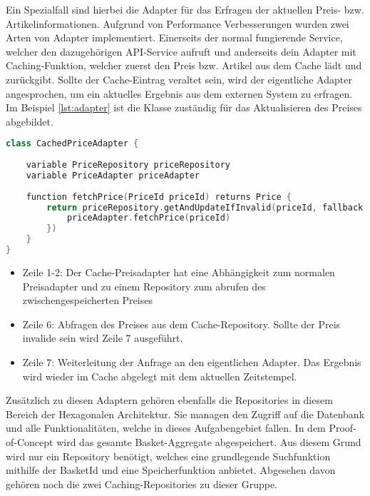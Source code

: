 Ein Spezialfall sind hierbei die Adapter für das Erfragen der aktuellen Preis- bzw. Artikelinformationen. Aufgrund von Performance Verbesserungen wurden zwei Arten von Adapter implementiert. Einerseits der normal fungierende Service, welcher den dazugehörigen API-Service aufruft und anderseits dein Adapter mit Caching-Funktion, welcher zuerst den Preis bzw. Artikel aus dem Cache lädt und zurückgibt. Sollte der Cache-Eintrag veraltet sein, wird der eigentliche Adapter angesprochen, um ein aktuelles Ergebnis aus dem externen System zu erfragen. Im Beispiel \ref{lst:adapter} ist die Klasse zuständig für das Aktualisieren des Preises abgebildet.

\begin{minipage}{\linewidth} %
	\begin{lstlisting}[caption={Preisadapter mit Caching-Funktion}, label={lst:adapter}, language=Kotlin]
class CachedPriceAdapter {
	
	variable PriceRepository priceRepository 
	variable PriceAdapter priceAdapter
	
	function fetchPrice(PriceId priceId) returns Price {
		return priceRepository.getAndUpdateIfInvalid(priceId, fallback = {
			priceAdapter.fetchPrice(priceId)
		})
	}
}
	\end{lstlisting}
\end{minipage}

\begin{itemize}[noitemsep,nolistsep]
	\item Zeile 1-2: Der Cache-Preisadapter hat eine Abhängigkeit zum normalen Preisadapter und zu einem Repository zum abrufen des zwischengespeicherten Preises
	\item Zeile 6: Abfragen des Preises aus dem Cache-Repository. Sollte der Preis invalide sein wird Zeile 7 ausgeführt.
	\item Zeile 7: Weiterleitung der Anfrage an den eigentlichen Adapter. Das Ergebnis wird wieder im Cache abgelegt mit dem aktuellen Zeitstempel.
\end{itemize}

Zusätzlich zu diesen Adaptern gehören ebenfalls die Repositories in diesem Bereich der Hexagonalen Architektur. Sie managen den Zugriff auf die Datenbank und alle Funktionalitäten, welche in dieses Aufgabengebiet fallen. In dem Proof-of-Concept wird das gesamte Basket-Aggregate abgespeichert. Aus diesem Grund wird nur ein Repository benötigt, welches eine grundlegende Suchfunktion mithilfe der BasketId und eine Speicherfunktion anbietet. Abgesehen davon gehören noch die zwei Caching-Repositories zu dieser Gruppe. 


